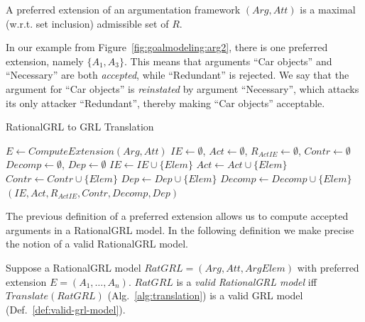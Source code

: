 \begin{definition} \label{def:semantics}
A preferred extension of an argumentation framework $(Arg,Att)$ is a maximal (w.r.t. set inclusion) admissible set of $R$.
\end{definition}

In our example from Figure~\ref{fig:goalmodeling:arg2}, there is one preferred extension, namely $\{A_1,A_3\}$. This means that arguments ``Car objects'' and ``Necessary'' are both \emph{accepted}, while ``Redundant'' is rejected. We say that the argument for ``Car objects'' is \emph{reinstated} by argument ``Necessary'', which attacks its only attacker ``Redundant'', thereby making ``Car objects'' acceptable.

\begin{algorithm}[h]
  \caption{RationalGRL to GRL Translation}\label{alg:translation}
  \begin{algorithmic}[1]
    \State $E \leftarrow ComputeExtension(Arg,Att)$
    \State $IE\leftarrow\emptyset$, $Act\leftarrow\emptyset$, $R_{ActIE}\leftarrow\emptyset$, $Contr\leftarrow\emptyset$
    \State $Decomp\leftarrow\emptyset$, $Dep\leftarrow\emptyset$
            \State $IE\leftarrow IE\cup \{Elem\}$
          \EndCase
            \State $Act\leftarrow Act \cup\{Elem\}$
          \EndCase
            \State $Contr\leftarrow Contr\cup \{Elem\}$
          \EndCase
            \State $Dep\leftarrow Dep\cup \{Elem\}$
          \EndCase
            \State $Decomp\leftarrow Decomp\cup\{Elem\}$
          \EndCase
      \EndSwitch
    \EndFor
    \State \Return $(IE,Act,R_{ActIE}, Contr, Decomp, Dep)$
    \EndProcedure
  \end{algorithmic}
\end{algorithm}

The previous definition of a preferred extension allows us to compute accepted arguments in a RationalGRL model. In the following definition we make precise the notion of a valid RationalGRL model.

\begin{definition}
Suppose a RationalGRL model $RatGRL = (Arg, Att, ArgElem)$ with preferred extension $E=(A_1,\ldots,A_n)$. $RatGRL$ is a \emph{valid RationalGRL model} iff $Translate(RatGRL)$ (Alg.~\ref{alg:translation}) is a valid GRL model (Def.~\ref{def:valid-grl-model}).
\end{definition}

